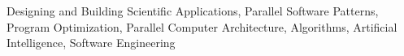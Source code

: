 
Designing and Building Scientific Applications, Parallel Software Patterns, Program Optimization, Parallel Computer Architecture, Algorithms, Artificial Intelligence, Software Engineering
